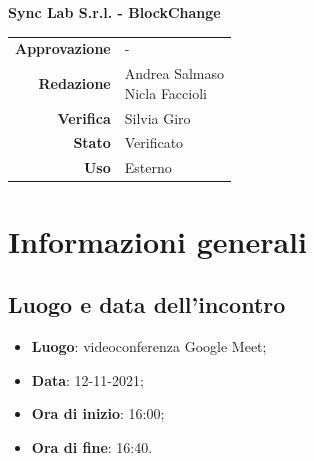 \documentclass[11pt]{article}
\begin{document}
\begin{titlepage}
\begin{center}
			\large
			\textbf{Sync Lab S.r.l. - BlockChange}\\
			
			\vfill
			
			\begin{tabular}{r|l}
				\textbf{Approvazione} &  -\\
				\textbf{Redazione} &  \parbox[t]{3.5cm}{Andrea Salmaso \\Nicla Faccioli}\\
				\textbf{Verifica} &  Silvia Giro\\
				\textbf{Stato} & Verificato \\
				\textbf{Uso} & Esterno
			\end{tabular}
			\vfill
			
		\end{center}
	\end{titlepage}

	\newpage
	
	\section{Informazioni generali}
		\subsection{Luogo e data dell'incontro}
			\begin{itemize}
				\item \textbf{Luogo}: videoconferenza Google Meet;
				\item \textbf{Data}: 12-11-2021;
				\item \textbf{Ora di inizio}: 16:00;
				\item \textbf{Ora di fine}: 16:40.
			\end{itemize}
		
\end{document}
